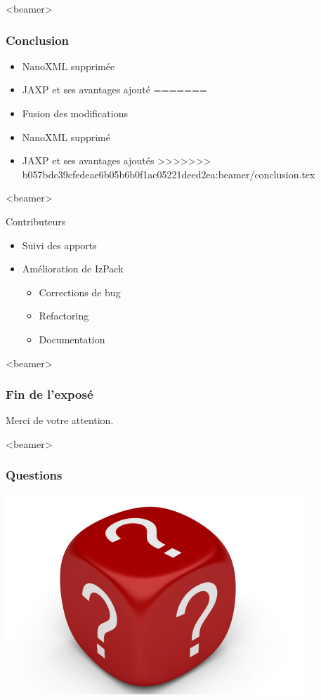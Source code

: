 \begin{frame}<beamer>
\frametitle{Conclusion}
\begin{itemize}
<<<<<<< HEAD:beamer/conclusion.tex
	\item NanoXML supprimée
	\item JAXP et ses avantages ajouté
=======
	\item Fusion des modifications
	\item NanoXML supprimé
	\item JAXP et ses avantages ajoutés
>>>>>>> b057bdc39cfedeae6b05b6b0f1ac05221deed2ea:beamer/conclusion.tex
\end{itemize}
\end{frame}
\begin{frame}<beamer>
\begin{beamerboxesrounded}[shadow=true]{Contributeurs}
\begin{itemize}
	\item Suivi des apports
	\item Amélioration de IzPack
	\begin{itemize}
		\item Corrections de bug
		\item Refactoring
		\item Documentation
	\end{itemize}
\end{itemize}
\end{beamerboxesrounded}
\end{frame}
\begin{frame}<beamer>\frametitle{Fin de l'exposé}
\begin{center}
\LARGE Merci de votre attention.
\end{center}
\end{frame}
\begin{frame}<beamer>\frametitle{Questions}
\begin{center}
\includegraphics[width=.6\linewidth]{../image/questionMark.jpg}
\end{center}
\end{frame}
